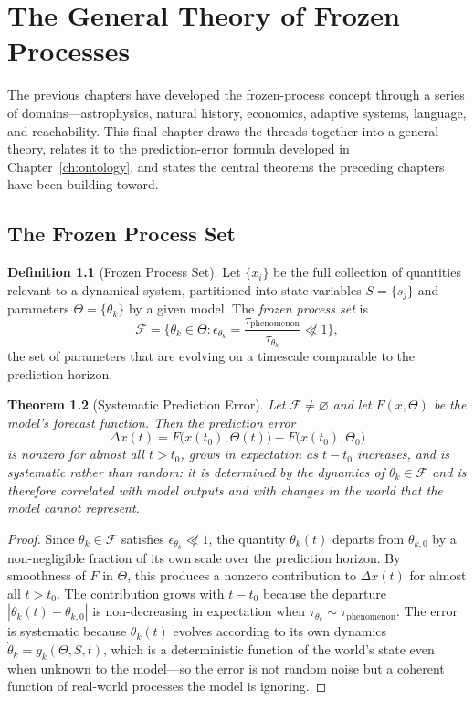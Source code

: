 \documentclass[11pt]{book}
\theoremstyle{plain}
\newtheorem{theorem}{Theorem}[chapter]
\theoremstyle{definition}
\newtheorem{definition}[theorem]{Definition}
\theoremstyle{remark}
\begin{document}
\chapter{The General Theory of Frozen Processes}
\label{ch:general}

The previous chapters have developed the frozen-process concept through a series of domains---astrophysics, natural history, economics, adaptive systems, language, and reachability. This final chapter draws the threads together into a general theory, relates it to the prediction-error formula developed in Chapter~\ref{ch:ontology}, and states the central theorems the preceding chapters have been building toward.

\section{The Frozen Process Set}

\begin{definition}[Frozen Process Set]
Let $\{x_i\}$ be the full collection of quantities relevant to a dynamical system, partitioned into state variables $S = \{s_j\}$ and parameters $\Theta = \{\theta_k\}$ by a given model. The \emph{frozen process set} is
\[
\mathcal{F} = \Big\{\theta_k \in \Theta : \epsilon_{\theta_k} = \frac{\tau_{\mathrm{phenomenon}}}{\tau_{\theta_k}} \not\ll 1\Big\},
\]
the set of parameters that are evolving on a timescale comparable to the prediction horizon.
\end{definition}

\begin{theorem}[Systematic Prediction Error]
\label{thm:systematic}
Let $\mathcal{F} \ne \varnothing$ and let $F(x, \Theta)$ be the model's forecast function. Then the prediction error
\[
\Delta x(t) = F\!\big(x(t_0), \Theta(t)\big) - F\!\big(x(t_0), \Theta_0\big)
\]
is nonzero for almost all $t > t_0$, grows in expectation as $t - t_0$ increases, and is \emph{systematic} rather than random: it is determined by the dynamics of $\theta_k \in \mathcal{F}$ and is therefore correlated with model outputs and with changes in the world that the model cannot represent.
\end{theorem}
\begin{proof}
Since $\theta_k \in \mathcal{F}$ satisfies $\epsilon_{\theta_k} \not\ll 1$, the quantity $\theta_k(t)$ departs from $\theta_{k,0}$ by a non-negligible fraction of its own scale over the prediction horizon. By smoothness of $F$ in $\Theta$, this produces a nonzero contribution to $\Delta x(t)$ for almost all $t > t_0$. The contribution grows with $t - t_0$ because the departure $|\theta_k(t) - \theta_{k,0}|$ is non-decreasing in expectation when $\tau_{\theta_k} \sim \tau_{\mathrm{phenomenon}}$. The error is systematic because $\theta_k(t)$ evolves according to its own dynamics $\dot\theta_k = g_k(\Theta, S, t)$, which is a deterministic function of the world's state even when unknown to the model---so the error is not random noise but a coherent function of real-world processes the model is ignoring.
\end{proof}
\end{document}
